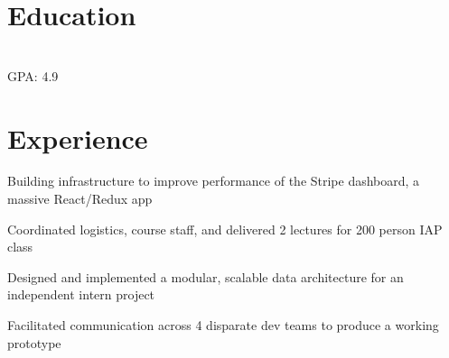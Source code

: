 \documentclass[]{deedy-resume-openfont}
\begin{document}
\section{Education}
\raggedright

\hfill {}\\
GPA: 4.9\\
\sectionsep

\section{Experience}
\hfill {}
\begin{tightemize}
	\item Building infrastructure to improve performance of the Stripe dashboard, a massive React/Redux app
\end{tightemize}
\sectionsep

\hfill {}
\begin{tightemize}
    \item Coordinated logistics, course staff, and delivered 2 lectures for 200 person IAP class
\end{tightemize}
\sectionsep

\hfill {}
\begin{tightemize}
    \item Designed and implemented a modular, scalable data architecture for an independent intern project
    \item Facilitated communication across 4 disparate dev teams to produce a working prototype
\end{tightemize}
\sectionsep
\end{document}
